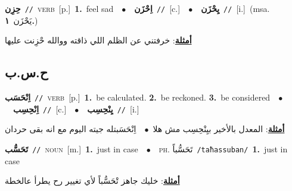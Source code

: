 \documentclass[10pt,a4paper,twoside]{article} %
\begin{document}
\begin{multicols}{2}
{\setlength\topsep{0pt}\textbf{\foreignlanguage{arabic}{حِزِن}}\ {\color{gray}\texttt{//}\color{black}}\ \textsc{verb}\ [p.]\ \textbf{1.}~feel sad\ \ $\bullet$\ \ \setlength\topsep{0pt}\textbf{\foreignlanguage{arabic}{اِحْزَن}}\ {\color{gray}\texttt{//}\color{black}}\ [c.]\ \ $\bullet$\ \ \setlength\topsep{0pt}\textbf{\foreignlanguage{arabic}{يِحْزَن}}\ {\color{gray}\texttt{//}\color{black}}\ [i.]\ \color{gray}(msa. \foreignlanguage{arabic}{يَحْزَن}~\foreignlanguage{arabic}{\textbf{١.}})\color{black}\  \begin{flushright}\color{gray}\foreignlanguage{arabic}{\textbf{\underline{\foreignlanguage{arabic}{أمثلة}}}: خرفتني عن الظلم اللي ذاقته ووالله حْزِنت عليها}\end{flushright}\color{black}} \vspace{2mm}

\vspace{-3mm}
\subsection*{\color{blue}\foreignlanguage{arabic}{ح.س.ب}\color{blue}{}} 

{\setlength\topsep{0pt}\textbf{\foreignlanguage{arabic}{اِنْحَسَب}}\ {\color{gray}\texttt{//}\color{black}}\ \textsc{verb}\ [p.]\ \textbf{1.}~be calculated.  \textbf{2.}~be reckoned.  \textbf{3.}~be considered\ \ $\bullet$\ \ \setlength\topsep{0pt}\textbf{\foreignlanguage{arabic}{اِنْحِسِب}}\ {\color{gray}\texttt{//}\color{black}}\ [c.]\ \ $\bullet$\ \ \setlength\topsep{0pt}\textbf{\foreignlanguage{arabic}{يِنْحِسِب}}\ {\color{gray}\texttt{//}\color{black}}\ [i.]\  \begin{flushright}\color{gray}\foreignlanguage{arabic}{\textbf{\underline{\foreignlanguage{arabic}{أمثلة}}}: المعدل بالأخير بيِنْحِسِب مش هلا\ $\bullet$\ \  اِنْحَسَبتله جيته اليوم مع انه بقى حردان}\end{flushright}\color{black}} \vspace{2mm}

{\setlength\topsep{0pt}\textbf{\foreignlanguage{arabic}{تَحَسُّب}}\ {\color{gray}\texttt{//}\color{black}}\ \textsc{noun}\ [m.]\ \textbf{1.}~just in case\ \ $\bullet$\ \ \textsc{ph.} \color{gray} \foreignlanguage{arabic}{تَحَسُّباً}\color{black}\ {\color{gray}\texttt{/{\sffamily taħassuban}/}\color{black}}\ \textbf{1.}~just in case\  \begin{flushright}\color{gray}\foreignlanguage{arabic}{\textbf{\underline{\foreignlanguage{arabic}{أمثلة}}}: خليك جاهز تْحَسُّباً لأي تغيير رح يطرأ عالخطة}\end{flushright}\color{black}} \vspace{2mm}


\end{multicols}
\end{document}
